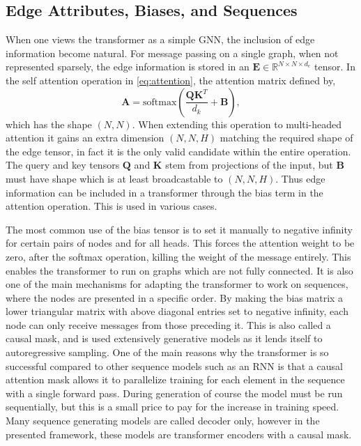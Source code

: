 \subsection{Edge Attributes, Biases, and Sequences}

When one views the transformer as a simple GNN, the inclusion of edge information become natural.
For message passing on a single graph, when not represented sparsely, the edge information is stored in an $\mathbf{E} \in \mathbb{R}^{N \times N \times d_e}$ tensor.
In the self attention operation in \cref{eq:attention}, the attention matrix defined by,
\begin{equation}
    \mathbf{A} = \text{softmax}\left( \frac{\mathbf{Q} \mathbf{K}^T}{d_k} + \mathbf{B} \right),
\end{equation}
which has the shape $(N, N)$.
When extending this operation to multi-headed attention it gains an extra dimension $(N, N, H)$ matching the required shape of the edge tensor, in fact it is the only valid candidate within the entire operation.
The query and key tensors $\mathbf{Q}$ and $\mathbf{K}$ stem from projections of the input, but $\mathbf{B}$ must have shape which is at least broadcastable to $(N, N, H)$.
Thus edge information can be included in a transformer through the bias term in the attention operation.
This is used in various cases.

The most common use of the bias tensor is to set it manually to negative infinity for certain pairs of nodes and for all heads.
This forces the attention weight to be zero, after the softmax operation, killing the weight of the message entirely.
This enables the transformer to run on graphs which are not fully connected.
It is also one of the main mechanisms for adapting the transformer to work on sequences, where the nodes are presented in a specific order.
By making the bias matrix a lower triangular matrix with above diagonal entries set to negative infinity, each node can only receive messages from those preceding it.
This is also called a causal mask, and is used extensively generative models as it lends itself to autoregressive sampling.
One of the main reasons why the transformer is so successful compared to other sequence models such as an RNN is that a causal attention mask allows it to parallelize training for each element in the sequence with a single forward pass.
During generation of course the model must be run sequentially, but this is a small price to pay for the increase in training speed.
Many sequence generating models are called decoder only, however in the presented framework, these models are transformer encoders with a causal mask.

